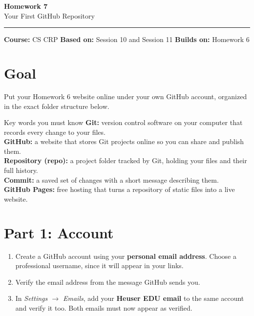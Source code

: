 \documentclass[11pt]{article}
\newcommand{\hw}[2]{{\Large\bfseries\color{navy} #1}\\[2pt]{\large #2}\\[-4pt]\rule{\textwidth}{1.2pt}}
\begin{document}
\hw{Homework 7}{Your First GitHub Repository}
\textbf{Course:} CS CRP \quad \textbf{Based on:} Session 10 and Session 11 \quad \textbf{Builds on:} Homework 6

\section*{Goal}
Put your Homework 6 website online under your own GitHub account, organized in the exact folder structure below.

\begin{term}{Key words you must know}
\textbf{Git:} version control software on your computer that records every change to your files.\\
\textbf{GitHub:} a website that stores Git projects online so you can share and publish them.\\
\textbf{Repository (repo):} a project folder tracked by Git, holding your files and their full history.\\
\textbf{Commit:} a saved set of changes with a short message describing them.\\
\textbf{GitHub Pages:} free hosting that turns a repository of static files into a live website.
\end{term}

\section*{Part 1: Account}
\begin{enumerate}[leftmargin=*]
\item Create a GitHub account using your \textbf{personal email address}. Choose a professional username, since it will appear in your links.
\item Verify the email address from the message GitHub sends you.
\item In \textit{Settings $\rightarrow$ Emails}, add your \textbf{Heuser EDU email} to the same account and verify it too. Both emails must now appear as verified.
\end{enumerate}
\end{document}
